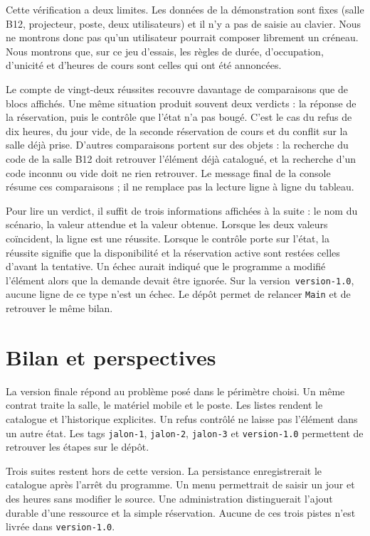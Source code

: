 \documentclass[11pt,a4paper]{article}
\begin{document}
Cette vérification a deux limites. Les données de la démonstration sont fixes (salle B12, projecteur, poste, deux utilisateurs) et il n'y a pas de saisie au clavier. Nous ne montrons donc pas qu'un utilisateur pourrait composer librement un créneau. Nous montrons que, sur ce jeu d'essais, les règles de durée, d'occupation, d'unicité et d'heures de cours sont celles qui ont été annoncées.

Le compte de vingt-deux réussites recouvre davantage de comparaisons que de blocs affichés. Une même situation produit souvent deux verdicts : la réponse de la réservation, puis le contrôle que l'état n'a pas bougé. C'est le cas du refus de dix heures, du jour vide, de la seconde réservation de cours et du conflit sur la salle déjà prise. D'autres comparaisons portent sur des objets : la recherche du code de la salle B12 doit retrouver l'élément déjà catalogué, et la recherche d'un code inconnu ou vide doit ne rien retrouver. Le message final de la console résume ces comparaisons ; il ne remplace pas la lecture ligne à ligne du tableau.

Pour lire un verdict, il suffit de trois informations affichées à la suite : le nom du scénario, la valeur attendue et la valeur obtenue. Lorsque les deux valeurs coïncident, la ligne est une réussite. Lorsque le contrôle porte sur l'état, la réussite signifie que la disponibilité et la réservation active sont restées celles d'avant la tentative. Un échec aurait indiqué que le programme a modifié l'élément alors que la demande devait être ignorée. Sur la version~\texttt{version-1.0}, aucune ligne de ce type n'est un échec. Le dépôt permet de relancer \texttt{Main} et de retrouver le même bilan.

\section{Bilan et perspectives}

La version finale répond au problème posé dans le périmètre choisi. Un même contrat traite la salle, le matériel mobile et le poste. Les listes rendent le catalogue et l'historique explicites. Un refus contrôlé ne laisse pas l'élément dans un autre état. Les tags \texttt{jalon-1}, \texttt{jalon-2}, \texttt{jalon-3} et \texttt{version-1.0} permettent de retrouver les étapes sur le dépôt.

Trois suites restent hors de cette version. La persistance enregistrerait le catalogue après l'arrêt du programme. Un menu permettrait de saisir un jour et des heures sans modifier le source. Une administration distinguerait l'ajout durable d'une ressource et la simple réservation. Aucune de ces trois pistes n'est livrée dans \texttt{version-1.0}.
\end{document}
